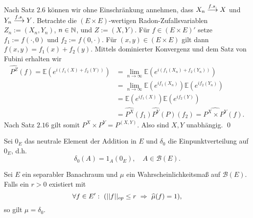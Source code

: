 \begin{proof*}%
    Nach  Satz $2.6$ können wir ohne Einschränkung annehmen, dass $X_n \overset{f.s.}{\longrightarrow} X$ und $Y_n \overset{f.s.}{\longrightarrow} Y$. 
    Betrachte die $(E \times E)$-wertigen Radon-Zufallsvariablen $Z_n:=(X_n,Y_n)$, $n \in \mathbb{N}$, und $Z:=(X,Y)$. 
    Für $f \in (E \times E)'$ setze $f_1 := f(\cdot, 0)$ und $f_2 := f(0, \cdot)$. Für $(x,y) \in (E \times E)$ gilt dann $f(x,y) = f_1(x) + f_2(y)$.
    Mittels dominierter Konvergenz und dem Satz von Fubini erhalten wir 
    \begin{align*}
        \widehat{P^Z}(f) = \mathbb{E}(e^{i(f_1(X) + f_2(Y))}) &= \lim_{n \to \infty}\mathbb{E}(e^{i(f_1(X_n) + f_2(Y_n))})  \\\
                                                       &= \lim_{n \to \infty}\mathbb{E}(e^{if_1(X_n)})\mathbb{E}(e^{if_2(Y_n)}) \\\
                                                       &= \mathbb{E}(e^{if_1(X)})\mathbb{E}(e^{if_2(Y)})  \\\
                                                       &= \widehat{P^X}(f_1)\widehat{P^Y}(P)(f_2) = \widehat{P^X \times P^Y}(f).
    \end{align*}
    Nach Satz $2.16$ gilt somit $P^X \times P^Y = P^{(X,Y)}$. Also sind $X,Y$ unabhängig. \qed
\end{proof*}

Sei $0_E$ das neutrale Element der Addition in $E$ und $\delta_0$ die Einpunktverteilung auf $0_E$, d.h. 
$$
    \delta_0(A) = 1_A(0_E), \quad A \in \mathcal{B}(E). 
$$

\begin{proposition}
    Sei $E$ ein separabler Banachraum und $\mu$ ein Wahrscheinlichkeitsmaß auf $\mathcal{B}(E)$. Falls ein $r > 0$ existiert mit
    $$
       \forall f \in E': \ ( \lvert\lvert f \rvert\rvert_{op} \leq r \ \Rightarrow \ \widehat{\mu}(f) = 1),
    $$
    so gilt $\mu = \delta_0$. 
\end{proposition}

